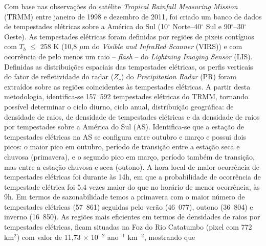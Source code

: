 \documentclass[12pt,a4paper,tocpage=plain,floatnumber=continuous,chapter=TITLE,appendix=nobox,font=plain, header=ruled,hyperindex=false]{abnt}
\begin{document}
\begin{resumo}

Com base nas observações do satélite \textit{Tropical Rainfall Measuring Mission} (TRMM) entre janeiro de  1998 e dezembro de 2011, foi criado um banco de dados de  tempestades elétricas sobre a América do Sul (10$^{\circ}$ Norte--40$^{\circ}$ Sul e 90$^{\circ}$--30$^{\circ}$ Oeste). As tempestades elétricas foram definidas por regiões de pixeis contíguos com $T_b$ $\leq$ 258 K  (10,8 $\mu$m do \textit{Visible and InfraRed Scanner} (VIRS)) e com ocorrência de pelo menos um raio -- \textit{flash} --  do \textit{Lightning Imaging Sensor} (LIS). Definidas as distribuições espaciais das tempestades elétricas, os perfis verticais do fator de refletividade  do radar ($Z_c$) do \textit{Precipitation Radar} (PR) foram extraídos sobre as regiões coincidentes às tempestades elétricas. A partir desta metodologia, identifica-se 157~592 tempestades elétricas do TRMM, tornando possível determinar o ciclo diurno, ciclo anual, distribuição geográfica: de densidade de raios, de densidade de tempestades elétricas e da densidade de raios por tempestades sobre a América do Sul (AS). Identifica-se que a estação de tempestades elétricas na AS se configura entre outubro e março e possui dois picos: o maior pico em outubro, período de transição entre a estação seca e chuvosa (primavera), e o segundo pico em março, período também de transição, mas entre a estação chuvosa e seca (outono). A hora local de maior ocorrência de tempestades elétricas  foi durante às 14h, em que a probabilidade de ocorrência de tempestade elétrica foi 5,4 vezes maior do que no horário de menor ocorrência, às 9h. Em termos de sazonabilidade temos a primavera com o maior número de tempestades elétricas (57~861) seguidas pelo verão (46~077), outono (36~804) e inverno (16~850). As regiões mais eficientes em termos de densidades de raios por tempestades elétricas, ficam situadas na Foz do Rio Catatumbo (pixel com 772 km$^{2}$) com valor de 11,73 $\times$ 10$^{-2}$ ano$^{-1}$ km$^{-2}$, mostrando que 

\end{resumo}
\end{document}
